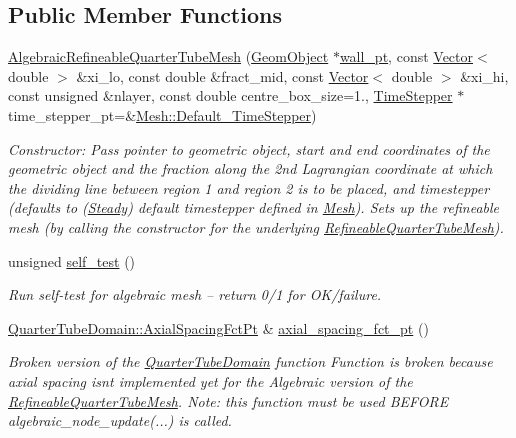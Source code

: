 \subsection*{Public Member Functions}
\begin{DoxyCompactItemize}
\item 
\hyperlink{classoomph_1_1AlgebraicRefineableQuarterTubeMesh_ad8ff9f32d4d180d815da65ddc3c4b90a}{Algebraic\+Refineable\+Quarter\+Tube\+Mesh} (\hyperlink{classoomph_1_1GeomObject}{Geom\+Object} $\ast$\hyperlink{classoomph_1_1QuarterTubeMesh_af59c4cde343ddd76caea4bc8c8ad8b94}{wall\+\_\+pt}, const \hyperlink{classoomph_1_1Vector}{Vector}$<$ double $>$ \&xi\+\_\+lo, const double \&fract\+\_\+mid, const \hyperlink{classoomph_1_1Vector}{Vector}$<$ double $>$ \&xi\+\_\+hi, const unsigned \&nlayer, const double centre\+\_\+box\+\_\+size=1., \hyperlink{classoomph_1_1TimeStepper}{Time\+Stepper} $\ast$time\+\_\+stepper\+\_\+pt=\&\hyperlink{classoomph_1_1Mesh_a12243d0fee2b1fcee729ee5a4777ea10}{Mesh\+::\+Default\+\_\+\+Time\+Stepper})
\begin{DoxyCompactList}\small\item\em Constructor\+: Pass pointer to geometric object, start and end coordinates of the geometric object and the fraction along the 2nd Lagrangian coordinate at which the dividing line between region 1 and region 2 is to be placed, and timestepper (defaults to (\hyperlink{classoomph_1_1Steady}{Steady}) default timestepper defined in \hyperlink{classoomph_1_1Mesh}{Mesh}). Sets up the refineable mesh (by calling the constructor for the underlying \hyperlink{classoomph_1_1RefineableQuarterTubeMesh}{Refineable\+Quarter\+Tube\+Mesh}). \end{DoxyCompactList}\item 
unsigned \hyperlink{classoomph_1_1AlgebraicRefineableQuarterTubeMesh_a1ad71be8274f4073b7e18cb53d574f10}{self\+\_\+test} ()
\begin{DoxyCompactList}\small\item\em Run self-\/test for algebraic mesh -- return 0/1 for O\+K/failure. \end{DoxyCompactList}\item 
\hyperlink{classoomph_1_1QuarterTubeDomain_ae347af42a5dcb9b3b82c2247975b01db}{Quarter\+Tube\+Domain\+::\+Axial\+Spacing\+Fct\+Pt} \& \hyperlink{classoomph_1_1AlgebraicRefineableQuarterTubeMesh_ac6518f83dd81c5ef1a8d908be8c9f473}{axial\+\_\+spacing\+\_\+fct\+\_\+pt} ()
\begin{DoxyCompactList}\small\item\em Broken version of the \hyperlink{classoomph_1_1QuarterTubeDomain}{Quarter\+Tube\+Domain} function Function is broken because axial spacing isn\textquotesingle{}t implemented yet for the Algebraic version of the \hyperlink{classoomph_1_1RefineableQuarterTubeMesh}{Refineable\+Quarter\+Tube\+Mesh}. Note\+: this function must be used B\+E\+F\+O\+RE algebraic\+\_\+node\+\_\+update(...) is called. \end{DoxyCompactList}\item 

\end{DoxyCompactItemize}
